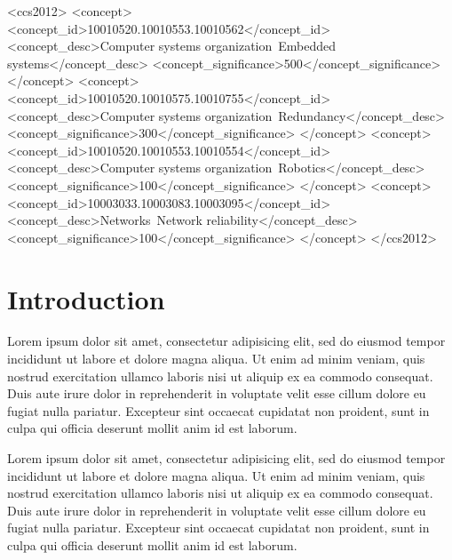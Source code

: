 \documentclass{sig-alternate-05-2015}
\begin{document}
%
%
\begin{CCSXML}
<ccs2012>
 <concept>
  <concept_id>10010520.10010553.10010562</concept_id>
  <concept_desc>Computer systems organization~Embedded systems</concept_desc>
  <concept_significance>500</concept_significance>
 </concept>
 <concept>
  <concept_id>10010520.10010575.10010755</concept_id>
  <concept_desc>Computer systems organization~Redundancy</concept_desc>
  <concept_significance>300</concept_significance>
 </concept>
 <concept>
  <concept_id>10010520.10010553.10010554</concept_id>
  <concept_desc>Computer systems organization~Robotics</concept_desc>
  <concept_significance>100</concept_significance>
 </concept>
 <concept>
  <concept_id>10003033.10003083.10003095</concept_id>
  <concept_desc>Networks~Network reliability</concept_desc>
  <concept_significance>100</concept_significance>
 </concept>
</ccs2012>
\end{CCSXML}



%
%

%
%
\printccsdesc



\section{Introduction}
Lorem ipsum dolor sit amet, consectetur adipisicing elit, sed do eiusmod tempor incididunt ut labore et dolore magna aliqua. Ut enim ad minim veniam, quis nostrud exercitation ullamco laboris nisi ut aliquip ex ea commodo consequat. Duis aute irure dolor in reprehenderit in voluptate velit esse cillum dolore eu fugiat nulla pariatur. Excepteur sint occaecat cupidatat non proident, sunt in culpa qui officia deserunt mollit anim id est laborum.

Lorem ipsum dolor sit amet, consectetur adipisicing elit, sed do eiusmod tempor incididunt ut labore et dolore magna aliqua. Ut enim ad minim veniam, quis nostrud exercitation ullamco laboris nisi ut aliquip ex ea commodo consequat. Duis aute irure dolor in reprehenderit in voluptate velit esse cillum dolore eu fugiat nulla pariatur. Excepteur sint occaecat cupidatat non proident, sunt in culpa qui officia deserunt mollit anim id est laborum.
\end{document}
